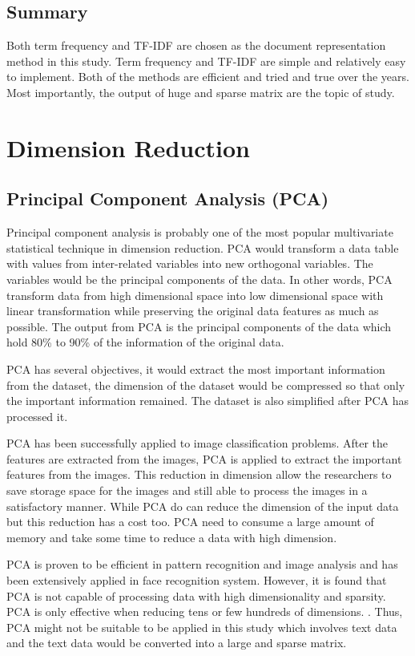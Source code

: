 \subsection{Summary}
Both term frequency and TF-IDF are chosen as the document representation method in this study. Term frequency and TF-IDF are simple and relatively easy to implement. Both of the methods are efficient and tried and true over the years. Most importantly, the output of huge and sparse matrix are the topic of study.\\

\clearpage
\section{Dimension Reduction}
\subsection{Principal Component Analysis (PCA)}
Principal component analysis is probably one of the most popular multivariate statistical technique in dimension reduction. PCA would transform a data table with values from inter-related variables into new orthogonal variables. The variables would be the principal components of the data. In other words, PCA transform data from high dimensional space into low dimensional space with linear transformation while preserving the original data features as much as possible. \cite{pcaImage} The output from PCA is the principal components of the data which hold 80\% to 90\% of the information of the original data.

PCA has several objectives, it would extract the most important information from the dataset, the dimension of the dataset would be compressed so that only the important information remained. The dataset is also simplified after PCA has processed it. \cite{pcaObj}

PCA has been successfully applied to image classification problems. After the features are extracted from the images, PCA is applied to extract the important features from the images. This reduction in dimension allow the researchers to save storage space for the images and still able to process the images in a satisfactory manner. While PCA do can reduce the dimension of the input data but this reduction has a cost too. PCA need to consume a large amount of memory and take some time to reduce a data with high dimension. \cite{pcaImage}

PCA is proven to be efficient in pattern recognition and image analysis and has been extensively applied in face recognition system. However, it is found that PCA is not capable of processing data with high dimensionality and sparsity. PCA is only effective when reducing tens or few hundreds of dimensions. \cite{dimRedCat}. Thus, PCA might not be suitable to be applied in this study which involves text data and the text data would be converted into a large and sparse matrix.\\

